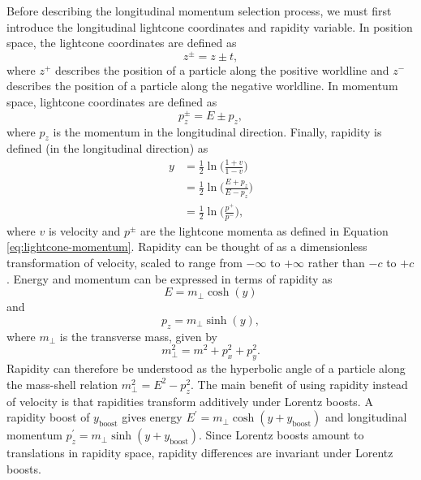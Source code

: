 \documentclass[12pt,a4paper]{report}
\begin{document}
Before describing the longitudinal momentum selection process, we must first introduce the longitudinal lightcone coordinates and rapidity variable. In position space, the lightcone coordinates are defined as
\begin{equation}
  z^\pm = z \pm t,
\end{equation}
where $z^+$ describes the position of a particle along the positive worldline and $z^-$ describes the position of a particle along the negative worldline. In momentum space, lightcone coordinates are defined as
\begin{equation}\label{eq:lightcone-momentum}
  p_z^\pm = E \pm p_z,
\end{equation}
where $p_z$ is the momentum in the longitudinal direction. Finally, rapidity is defined (in the longitudinal direction) as
\begin{align}
  y &= \frac{1}{2} \ln \Bigr( \frac{1+v}{1-v}\Bigr)  \nonumber \\
    &= \frac{1}{2} \ln \Bigr( \frac{E + p_z}{E - p_z} \Bigr) \nonumber \\
  &= \frac{1}{2} \ln \Bigr(\frac{p^+}{p^-}\Bigr),
\end{align}
where $v$ is velocity and $p^\pm$ are the lightcone momenta as defined in Equation \eqref{eq:lightcone-momentum}. Rapidity can be thought of as a dimensionless transformation of velocity, scaled to range from $-\infty$ to $+\infty$ rather than $-c$ to $+c$. Energy and momentum can be expressed in terms of rapidity as
\begin{equation}
  E = m_\perp \cosh(y)
\end{equation}
and
\begin{equation}
  p_z = m_\perp \sinh(y),
\end{equation}
where $m_\perp$ is the transverse mass, given by
\begin{equation}
  m_\perp^2 = m^2 + p_x^2 + p_y^2.
\end{equation}
Rapidity can therefore be understood as the hyperbolic angle of a particle along the mass-shell relation $m_\perp^2 = E^2 - p_z^2$. The main benefit of using rapidity instead of velocity is that rapidities transform additively under Lorentz boosts. A rapidity boost of $y_\text{boost}$ gives energy $E^\prime = m_\perp \cosh(y + y_\text{boost})$ and longitudinal momentum $p_z^\prime = m_\perp \sinh(y + y_\text{boost})$. Since Lorentz boosts amount to translations in rapidity space, rapidity differences are invariant under Lorentz boosts.
\end{document}
